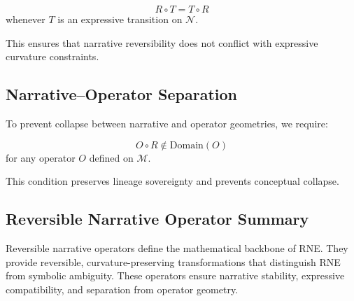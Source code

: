 \[
R \circ T = T \circ R
\]
whenever $T$ is an expressive transition on $\mathcal{N}$.

This ensures that narrative reversibility does not conflict with expressive
curvature constraints.

\subsection{Narrative–Operator Separation}

To prevent collapse between narrative and operator geometries, we require:

\[
O \circ R \notin \text{Domain}(O)
\]
for any operator $O$ defined on $\mathcal{M}$.

This condition preserves lineage sovereignty and prevents conceptual collapse.

\subsection{Reversible Narrative Operator Summary}

Reversible narrative operators define the mathematical backbone of RNE. They
provide reversible, curvature-preserving transformations that distinguish RNE
from symbolic ambiguity. These operators ensure narrative stability, expressive
compatibility, and separation from operator geometry.

